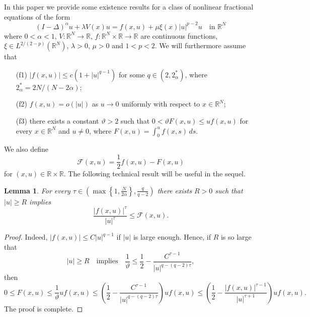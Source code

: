 \documentclass[11pt]{amsart}
\numberwithin{equation}{section}
\newtheorem{lemma}[theorem]{Lemma}
\theoremstyle{remark}
\theoremstyle{definition}
\begin{document}
In this paper we provide some existence results for a class of nonlinear fractional equations of the form
\begin{equation} \label{eq:1}
\left( I-\Delta \right)^{\alpha} u + \lambda V(x) u= f(x,u)+\mu \xi(x)|u|^{p-2}u \quad \text{in $\mathbb{R}^N$}
\end{equation}
where $0<\alpha <1$, $V \colon \mathbb{R}^N \to \mathbb{R}$, $f \colon \mathbb{R}^N \times \mathbb{R} \to \mathbb{R}$ are continuous functions, $\xi \in L^{2/(2-p)}(\mathbb{R}^N)$, $\lambda >0$, $\mu >0$ and $1<p<2$. We will furthermore assume that
\begin{itemize}
	\item[(f1)] $|f(x,u)| \leqslant c ( 1+|u|^{q-1})$ for some $q \in (2,2_\alpha^*)$, where $2_\alpha^* = 2N/(N-2\alpha)$;
	\item[(f2)] $f(x,u)=o(|u|)$ as $u \to 0$ uniformly with respect to $x \in \mathbb{R}^N$;
	\item[(f3)] there exists a constant $\vartheta > 2$ such that $0 < \vartheta F(x,u) \leqslant u f(x,u)$ for every $x \in \mathbb{R}^N$ and $u \neq 0$, where $F(x,u)=\int_{0}^{u} f(x,s)\, ds$.
\end{itemize}
We also define
\begin{equation} \label{eq:1.2}
\mathscr{F}(x,u) = \frac{1}{2} f(x,u) - F(x,u)
\end{equation}
for $(x,u) \in \mathbb{R} \times \mathbb{R}$.
The following technical result will be useful in the sequel.
\begin{lemma} \label{lem:1.1}
  For every $\tau \in \left( \max \left\{ 1, \frac{N}{2\alpha} \right\},\frac{q}{q-2} \right)$ there exists $R > 0$ such that $|u| \geqslant R$ implies
\[
\frac{|f(x,u)|^\tau}{|u|^\tau} \leqslant \mathscr{F}(x,u).
\]
\end{lemma}
\begin{proof}
Indeed, $|f(x,u)| \leqslant C |u|^{q-1}$ if $|u|$ is large enough. Hence, if $R$ is so large that
\[
|u| \geqslant R \quad\text{implies}\quad \frac{1}{\vartheta} \leqslant \frac{1}{2} - \frac{C^{\tau-1}}{|u|^{q-(q-2)\tau}},
\]
then
\begin{equation*}
0 \leqslant F(x,u) \leqslant \frac{1}{\vartheta} u f(x,u) \leqslant \left( \frac{1}{2} - \frac{C^{\tau-1}}{|u|^{q-(q-2)\tau}} \right) u f(x,u) \leqslant \left( \frac{1}{2} - \frac{|f(x,u)|^{\tau-1}}{|u|^{\tau+1}} \right) u f(x,u).
\end{equation*}
The proof is complete.
\end{proof}
\end{document}
